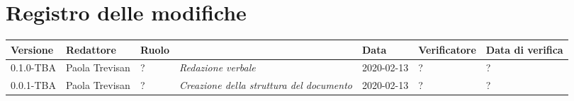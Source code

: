\section*{Registro delle modifiche}
\renewcommand{\arraystretch}{1.8}

	\begin{longtable}{|p{1.5cm}|p{1.7cm}|p{2cm}|p{2cm}|p{1.7cm}|p{2cm}|p{1.7cm}|}
		\hline

		\rowcolor{header}
		\textbf{Versione} & \textbf{Redattore} & \textbf{Ruolo} & \centering{\textbf{Descrizione}} & \textbf{Data}  & \textbf{Verificatore} & \textbf{Data di verifica}  \\

		\hline
		0.1.0-TBA & Paola Trevisan & ? & \small{\textit{Redazione verbale}} & 2020-02-13 & ? & ? \\
		0.0.1-TBA & Paola Trevisan & ? & \small{\textit{Creazione della struttura del documento}} & 2020-02-13 & ? & ?\\

		\hline
	\end{longtable}
